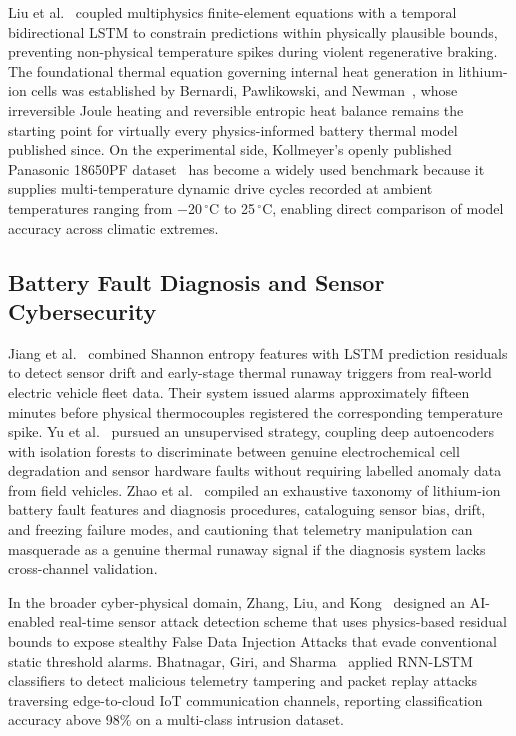 \documentclass[conference]{IEEEtran}
\begin{document}
Liu et al.~\cite{liu2024study} coupled multiphysics finite-element equations with a temporal bidirectional LSTM to constrain predictions within physically plausible bounds, preventing non-physical temperature spikes during violent regenerative braking. The foundational thermal equation governing internal heat generation in lithium-ion cells was established by Bernardi, Pawlikowski, and Newman~\cite{bernardi1985general}, whose irreversible Joule heating and reversible entropic heat balance remains the starting point for virtually every physics-informed battery thermal model published since. On the experimental side, Kollmeyer's openly published Panasonic 18650PF dataset~\cite{kollmeyer2020panasonic} has become a widely used benchmark because it supplies multi-temperature dynamic drive cycles recorded at ambient temperatures ranging from $-$20\,$^\circ$C to 25\,$^\circ$C, enabling direct comparison of model accuracy across climatic extremes.

\subsection{Battery Fault Diagnosis and Sensor Cybersecurity}

Jiang et al.~\cite{jiang2021data} combined Shannon entropy features with LSTM prediction residuals to detect sensor drift and early-stage thermal runaway triggers from real-world electric vehicle fleet data. Their system issued alarms approximately fifteen minutes before physical thermocouples registered the corresponding temperature spike. Yu et al.~\cite{yu2024unsupervised} pursued an unsupervised strategy, coupling deep autoencoders with isolation forests to discriminate between genuine electrochemical cell degradation and sensor hardware faults without requiring labelled anomaly data from field vehicles. Zhao et al.~\cite{zhao2024review} compiled an exhaustive taxonomy of lithium-ion battery fault features and diagnosis procedures, cataloguing sensor bias, drift, and freezing failure modes, and cautioning that telemetry manipulation can masquerade as a genuine thermal runaway signal if the diagnosis system lacks cross-channel validation.

In the broader cyber-physical domain, Zhang, Liu, and Kong~\cite{zhang2023ai} designed an AI-enabled real-time sensor attack detection scheme that uses physics-based residual bounds to expose stealthy False Data Injection Attacks that evade conventional static threshold alarms. Bhatnagar, Giri, and Sharma~\cite{bhatnagar2024anomaly} applied RNN-LSTM classifiers to detect malicious telemetry tampering and packet replay attacks traversing edge-to-cloud IoT communication channels, reporting classification accuracy above 98\% on a multi-class intrusion dataset.
\end{document}
